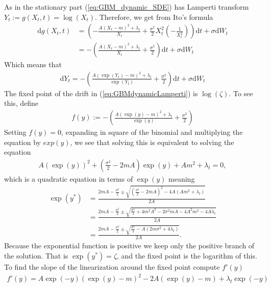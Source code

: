 As in the stationary part (\ref{eq:GBM_dynamic_SDE}) has Lamperti transform $Y_t:= g(X_t, t) = \log(X_t)$. Therefore, we get from Ito's formula
\begin{align}
    \mathrm{d}g(X_t, t) &= \left(-\frac{A\left(X_t-m\right)^2 + \lambda_t}{X_t} + \frac{\sigma^2}{2}X_t^2\left(-\frac{1}{X_t^{2}}\right)\right)\mathrm{d}t + \sigma \mathrm{d}W_t \nonumber \\
    &= -\left(\frac{A\left(X_t-m\right)^2 + \lambda_t}{X_t} + \frac{\sigma^2}{2}\right)\mathrm{d}t + \sigma \mathrm{d}W_t
\end{align}
Which means that
\begin{align}
    \mathrm{d}Y_t = - \left(\frac{A\left(\exp\left(Y_t\right)-m\right)^2 + \lambda_t}{\exp(Y_t)} + \frac{\sigma^2}{2}\right)\mathrm{d}t + \sigma \mathrm{d}W_t \label{eq:GBMdynamicLamperti}
\end{align}
The fixed point of the drift in (\ref{eq:GBMdynamicLamperti}) is $\log\left(\zeta\right)$. To see this, define
\begin{align}
    f(y) := -\left(\frac{A\left(\exp\left(y\right)-m\right)^2 + \lambda_t}{\exp(y)} + \frac{\sigma^2}{2}\right)
\end{align}
Setting $f(y) = 0$, expanding in square of the binomial and multiplying the equation by $exp(y)$, we see that solving this is equivalent to solving the equation
\begin{align}
    A\left(\exp\left(y\right)\right)^2 + \left(\frac{\sigma^2}{2} - 2mA\right)\exp\left(y\right) + Am^2 + \lambda_t = 0,
\end{align}
which is a quadratic equation in terms of $\exp(y)$ meaning
\begin{align}
    \exp(y^*) &= \frac{2mA - \frac{\sigma^2}{2}\pm\sqrt{\left(\frac{\sigma^2}{2} - 2mA\right)^2 - 4A\left(Am^2 + \lambda_t\right)}}{2A}\nonumber \\
    &= \frac{2mA - \frac{\sigma^2}{2}\pm\sqrt{\frac{\sigma^4}{4} + 4m^2A^2 - 2\sigma^2mA-4A^2m^2-4A\lambda_t}}{2A}\nonumber \\
    &= \frac{2mA - \frac{\sigma^2}{2}\pm\sqrt{\frac{\sigma^4}{4}-A\left(2m\sigma^2 + 4\lambda_t\right)}}{2A}.
\end{align}
Because the exponential function is positive we keep only the positive branch of the solution. That is $\exp\left(y^*\right) = \zeta$, and the fixed point is the logarithm of this. To find the slope of the linearization around the fixed point compute $f'(y)$
\begin{align}
    f'(y) = A\exp(-y)\left(\exp(y) - m\right)^2 - 2A\left(\exp(y) - m\right) + \lambda_t\exp(-y)
\end{align}
